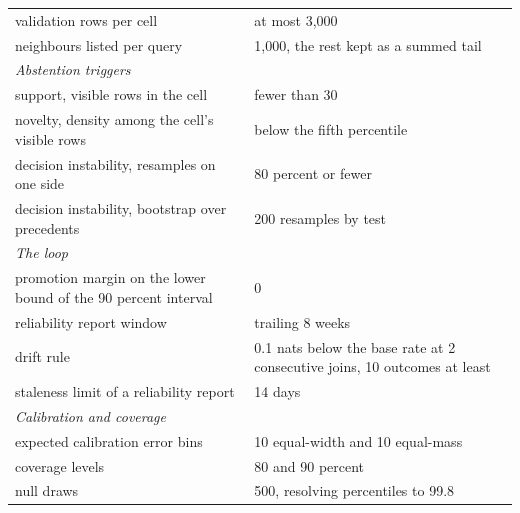 \documentclass[sigconf,nonacm]{acmart}
\begin{document}
\begin{table}[t]
\begin{tabular}{p{}p{}}
validation rows per cell & at most 3,000 \\
neighbours listed per query & 1,000, the rest kept as a summed tail \\
\midrule
\multicolumn{2}{l}{\emph{Abstention triggers}} \\
support, visible rows in the cell & fewer than 30 \\
novelty, density among the cell's visible rows & below the fifth percentile \\
decision instability, resamples on one side & 80 percent or fewer \\
decision instability, bootstrap over precedents & 200 resamples by test \\
\midrule
\multicolumn{2}{l}{\emph{The loop}} \\
promotion margin on the lower bound of the 90 percent interval & 0 \\
reliability report window & trailing 8 weeks \\
drift rule & 0.1 nats below the base rate at 2 consecutive joins, 10 outcomes at least \\
staleness limit of a reliability report & 14 days \\
\midrule
\multicolumn{2}{l}{\emph{Calibration and coverage}} \\
expected calibration error bins & 10 equal-width and 10 equal-mass \\
coverage levels & 80 and 90 percent \\
null draws & 500, resolving percentiles to 99.8 \\

\end{tabular}
\end{table}
\end{document}
